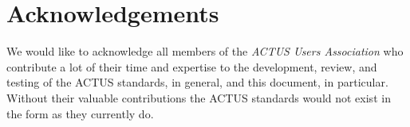 \documentclass[9pt,oneside]{amsart}
\begin{document}
\section*{Acknowledgements}\label{sec:ack}

We would like to acknowledge all members of the \textit{ACTUS Users Association} who contribute a lot of their time and expertise to the development, review, and testing of the ACTUS standards, in general, and this document, in particular. Without their valuable contributions the ACTUS standards would not exist in the form as they currently do.



\newpage
\tableofcontents




\newpage
\end{document}
